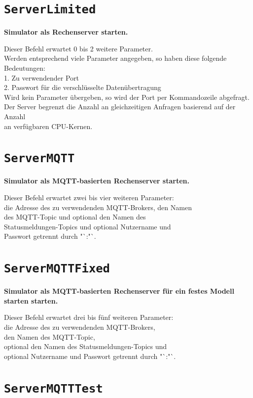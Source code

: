 \section{\texttt{ServerLimited}}

\textbf{Simulator als Rechenserver starten.}

Dieser Befehl erwartet 0 bis 2 weitere Parameter.\\
Werden entsprechend viele Parameter angegeben, so haben diese folgende Bedeutungen:\\
1. Zu verwendender Port\\
2. Passwort für die verschlüsselte Datenübertragung\\
Wird kein Parameter übergeben, so wird der Port per Kommandozeile abgefragt.\\
Der Server begrenzt die Anzahl an gleichzeitigen Anfragen basierend auf der Anzahl\\
an verfügbaren CPU-Kernen.

\section{\texttt{ServerMQTT}}

\textbf{Simulator als MQTT-basierten Rechenserver starten.}

Dieser Befehl erwartet zwei bis vier weiteren Parameter:\\
die Adresse des zu verwendenden MQTT-Brokers, den Namen\\
des MQTT-Topic und optional den Namen des\\
Statusmeldungen-Topics und optional Nutzername und\\
Passwort getrennt durch "`:"`.

\section{\texttt{ServerMQTTFixed}}

\textbf{Simulator als MQTT-basierten Rechenserver für ein festes Modell starten starten.}

Dieser Befehl erwartet drei bis fünf weiteren Parameter:\\
die Adresse des zu verwendenden MQTT-Brokers,\\
den Namen des MQTT-Topic,\\
optional den Namen des Statusmeldungen-Topics und \\
optional Nutzername und Passwort getrennt durch "`:"`.

\section{\texttt{ServerMQTTTest}}

